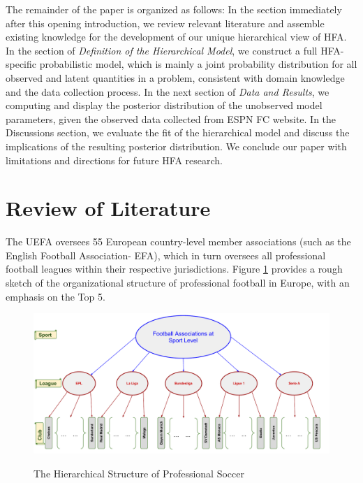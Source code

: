\documentclass[USenglish]{article}
\begin{document}
The remainder of the paper is organized as follows: In the section immediately after this opening introduction, we review relevant literature and assemble existing knowledge for the development of our unique hierarchical view of HFA. 
In the section of \textit{Definition of the Hierarchical Model}, we construct a full HFA-specific probabilistic model, which is mainly a joint probability distribution for all observed and latent quantities in a problem, consistent with domain knowledge and the data collection process.
In the next section of \textit{Data and Results}, we computing and display the posterior distribution of the unobserved model parameters, given the observed data collected from ESPN FC website.
In the Discussions section, we evaluate the fit of the hierarchical model and discuss the implications of the resulting posterior distribution. We conclude our paper with limitations and directions for future HFA research.
 
\section{Review of Literature} 

The UEFA oversees 55 European country-level member associations (such as the English Football Association- EFA), which in turn oversees all professional football leagues within their respective jurisdictions. Figure \ref{fig21} provides a rough sketch of the organizational structure of professional football in Europe, with an emphasis on the Top 5.

\begin{figure}
\caption{The Hierarchical Structure of Professional Soccer }
{\includegraphics[width=1.0\linewidth]{HFA_22}}
\label{fig21}
\end{figure} 
\end{document}
